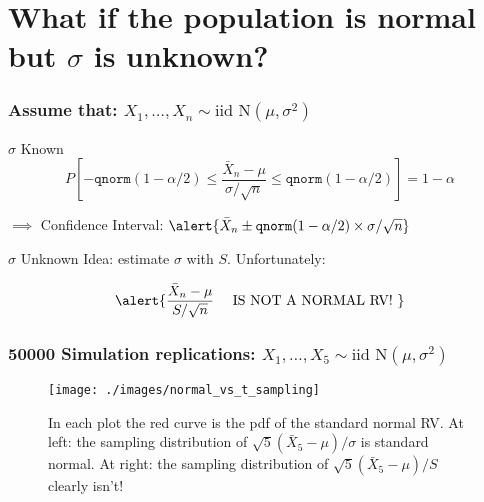 \section{What if the population is normal but $\sigma$ is unknown?}
\begin{frame}
  \frametitle{Assume that: $X_1, \dots, X_n \sim \text{iid N}(\mu, \sigma^2)$}

\begin{block}{$\sigma$ Known}
  \[P\left[ -\texttt{qnorm}(1 - \alpha/2) \leq \frac{\bar{X}_n - \mu}{\sigma/\sqrt{n}}\leq \texttt{qnorm}(1 - \alpha/2) \right] = 1 - \alpha\]

  \vspace{1em}
  $\implies$ Confidence Interval: $\alert{\bar{X}_n \pm \texttt{qnorm}(1 - \alpha/2) \times \sigma/ \sqrt{n}}$
\end{block}

\pause

\begin{block}{$\sigma$ Unknown}
  Idea: estimate $\sigma$ with $S$. Unfortunately: 

  \[
    \alert{\frac{\bar{X}_n - \mu}{S/\sqrt{n}} \quad \text{ IS NOT A NORMAL RV! }}
  \]

\end{block}

\end{frame}
\begin{frame}
  \frametitle{50000 Simulation replications: $X_1, \dots, X_5 \sim \text{iid N}(\mu, \sigma^2)$}

  \vspace{3em}

  \begin{figure}
    \centering
\texttt{[image: ./images/normal\_vs\_t\_sampling]}
\caption{In each plot the red curve is the pdf of the standard normal RV. At left: the sampling distribution of $\sqrt{5}(\bar{X}_5 - \mu)/\sigma$ is standard normal. At right: the sampling distribution of $\sqrt{5}(\bar{X}_5 - \mu)/S$ clearly isn't!}
\end{figure}

\end{frame}

